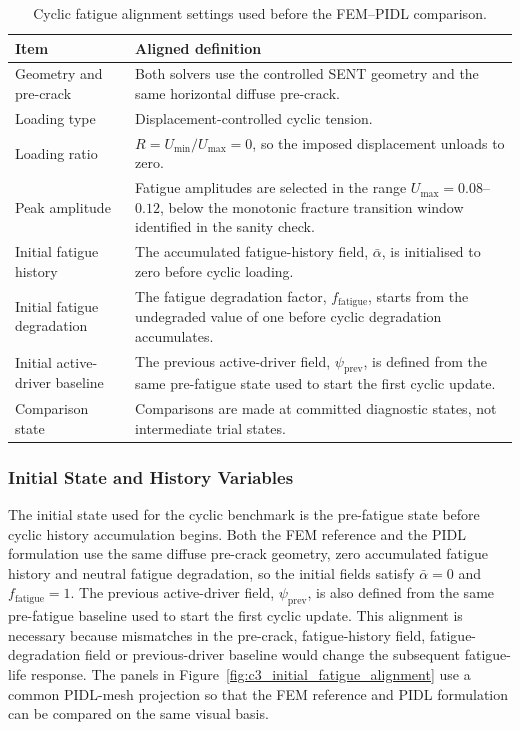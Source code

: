 \begin{table}[!htbp]
\centering
\caption{Cyclic fatigue alignment settings used before the FEM--PIDL comparison.}
\label{tab:c3_cyclic_alignment_settings}
\begin{tabular}{p{} p{}}
\hline
\textbf{Item} & \textbf{Aligned definition} \\
\hline
Geometry and pre-crack
& Both solvers use the controlled SENT geometry and the same horizontal diffuse pre-crack. \\

Loading type
& Displacement-controlled cyclic tension. \\

Loading ratio
& \(R=U_{\min}/U_{\max}=0\), so the imposed displacement unloads to zero. \\

Peak amplitude
& Fatigue amplitudes are selected in the range \(U_{\max}=0.08\)--\(0.12\), below the monotonic fracture transition window identified in the sanity check. \\

Initial fatigue history
& The accumulated fatigue-history field, \(\bar{\alpha}\), is initialised to zero before cyclic loading. \\

Initial fatigue degradation
& The fatigue degradation factor, \(f_{\mathrm{fatigue}}\), starts from the undegraded value of one before cyclic degradation accumulates. \\

Initial active-driver baseline
& The previous active-driver field, \(\psi_{\mathrm{prev}}\), is defined from the same pre-fatigue state used to start the first cyclic update. \\

Comparison state
& Comparisons are made at committed diagnostic states, not intermediate trial states. \\
\hline
\end{tabular}
\end{table}


\subsubsection{Initial State and History Variables}
\label{subsec:c3_initial_history_variables}

The initial state used for the cyclic benchmark is the pre-fatigue state before cyclic history accumulation begins. Both the FEM reference and the PIDL formulation use the same diffuse pre-crack geometry, zero accumulated fatigue history and neutral fatigue degradation, so the initial fields satisfy \(\bar{\alpha}=0\) and \(f_{\mathrm{fatigue}}=1\). The previous active-driver field, \(\psi_{\mathrm{prev}}\), is also defined from the same pre-fatigue baseline used to start the first cyclic update. This alignment is necessary because mismatches in the pre-crack, fatigue-history field, fatigue-degradation field or previous-driver baseline would change the subsequent fatigue-life response. The panels in Figure~\ref{fig:c3_initial_fatigue_alignment} use a common PIDL-mesh projection so that the FEM reference and PIDL formulation can be compared on the same visual basis.


